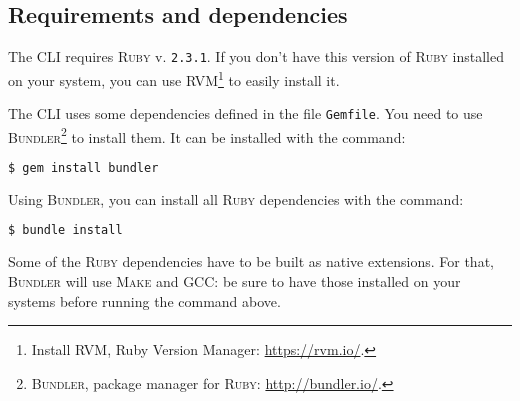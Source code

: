 
\subsection{Requirements and dependencies}
\label{subsec:clustersetup:requirements}

The CLI requires \textsc{Ruby} v. \texttt{2.3.1}.
If you don't have this version of \textsc{Ruby} installed on your system, you can use \textsc{RVM}\footnote{Install \textsc{RVM}, Ruby Version Manager: \url{https://rvm.io/}.} to easily install it.

The CLI uses some dependencies defined in the file \texttt{Gemfile}. You need to use \textsc{Bundler}\footnote{\textsc{Bundler}, package manager for \textsc{Ruby}: \url{http://bundler.io/}.} to install them.
It can be installed with the command:

\begin{lstlisting}[language=bash, basicstyle=\small]
$ gem install bundler
\end{lstlisting}

Using \textsc{Bundler}, you can install all \textsc{Ruby} dependencies with the command:

\begin{lstlisting}[language=bash, basicstyle=\small]
$ bundle install
\end{lstlisting}

Some of the \textsc{Ruby} dependencies have to be built as native extensions.
For that, \textsc{Bundler} will use \textsc{Make} and \textsc{GCC}: be sure to have those installed on your systems before running the command above.
